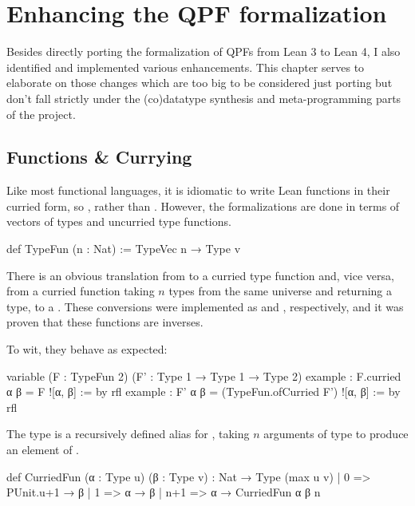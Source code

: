 
\chapter{Enhancing the QPF formalization}%
\label{ch:enhancing}


Besides directly porting the formalization of QPFs from Lean 3 to Lean 4, I also identified and implemented various enhancements. 
This chapter serves to elaborate on those changes which are too big to be considered just porting but don't fall strictly under the (co)datatype synthesis and meta-programming parts of the project.






\section{Functions \& Currying}
Like most functional languages, it is idiomatic to write Lean functions in their curried form, 
so , rather than .
However, the formalizations are done in terms of vectors of types and uncurried type functions.

\begin{leancode}
    def TypeFun (n : Nat) := TypeVec n → Type v
\end{leancode}

There is an obvious translation from  to a curried type function and, vice versa, from a curried function taking $n$ types from the same universe and returning a type, to a .
These conversions were implemented as  and , respectively, and it was proven that these functions are inverses. 

To wit, they behave as expected:
\begin{leancode}
  variable (F : TypeFun 2) (F' : Type 1 → Type 1 → Type 2)
  example : F.curried α β = F ![α, β]                 := by rfl
  example : F' α β = (TypeFun.ofCurried F') ![α, β]   := by rfl
\end{leancode}

The type  is a recursively defined alias for , taking $n$ arguments of type  to produce an element of .
\begin{leancode}
  def CurriedFun (α : Type u) (β : Type v) : Nat → Type (max u v)
    | 0   => PUnit.{u+1} → β
    | 1   => α → β
    | n+1 => α → CurriedFun α β n
\end{leancode}

